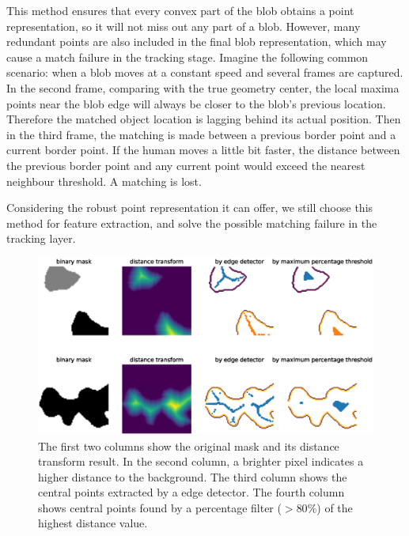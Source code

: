 This method ensures that every convex part of the blob obtains a point representation, so it will not miss out any part of a blob. However, many redundant points are also included in the final blob representation, which may cause a match failure in the tracking stage. Imagine the following common scenario: when a blob moves at a constant speed and several frames are captured. In the second frame, comparing with the true geometry center, the local maxima points near the blob edge will always be closer to the blob's previous location. Therefore the matched object location is lagging behind its actual position. Then in the third frame, the matching is made between a previous border point and a current border point. If the human moves a little bit faster, the distance between the previous border point and any current point would exceed the nearest neighbour threshold. A matching is lost.

Considering the robust point representation it can offer, we still choose this method for feature extraction, and solve the possible matching failure in the tracking layer.
\begin{figure}
  \centering
  \includegraphics[width=\textwidth]{figures/centralsbyfilter.eps}
  \caption{The first two columns show the original mask and its distance transform result. In the second column, a brighter pixel indicates a higher distance to the background. The third column shows the central points extracted by a edge detector. The fourth column shows central points found by a percentage filter ($> 80\%$) of the highest distance value.}
  \label{fig:DTafterfilter}
\end{figure}

